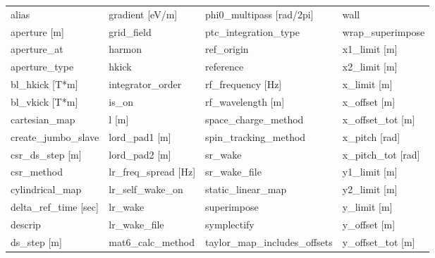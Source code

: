  \begin{tabular}{llll} \toprule
alias                            & gradient [eV/m]                  & phi0_multipass [rad/2pi]         & wall                             \\
aperture [m]                     & grid_field                       & ptc_integration_type             & wrap_superimpose                 \\
aperture_at                      & harmon                           & ref_origin                       & x1_limit [m]                     \\
aperture_type                    & hkick                            & reference                        & x2_limit [m]                     \\
bl_hkick [T*m]                   & integrator_order                 & rf_frequency [Hz]                & x_limit [m]                      \\
bl_vkick [T*m]                   & is_on                            & rf_wavelength [m]                & x_offset [m]                     \\
cartesian_map                    & l [m]                            & space_charge_method              & x_offset_tot [m]                 \\
create_jumbo_slave               & lord_pad1 [m]                    & spin_tracking_method             & x_pitch [rad]                    \\
csr_ds_step [m]                  & lord_pad2 [m]                    & sr_wake                          & x_pitch_tot [rad]                \\
csr_method                       & lr_freq_spread [Hz]              & sr_wake_file                     & y1_limit [m]                     \\
cylindrical_map                  & lr_self_wake_on                  & static_linear_map                & y2_limit [m]                     \\
delta_ref_time [sec]             & lr_wake                          & superimpose                      & y_limit [m]                      \\
descrip                          & lr_wake_file                     & symplectify                      & y_offset [m]                     \\
ds_step [m]                      & mat6_calc_method                 & taylor_map_includes_offsets      & y_offset_tot [m]                 \\

\end{tabular}
